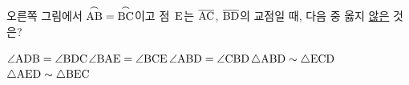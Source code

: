\noindent\begin{minipage}[t]{0.58\linewidth}\vspace{0pt}\raggedright 오른쪽 그림에서 $\overset{\frown}{\mathrm{AB}}=\overset{\frown}{\mathrm{BC}}$이고 점~$\mathrm{E}$는 $\overline{\mathrm{AC}}$, $\overline{\mathrm{BD}}$의 교점일 때, 다음 중 옳지 \underline{않은} 것은?\end{minipage}\hfill\begin{minipage}[t]{0.4\linewidth}\vspace{0pt}\centering \resizebox{\ifdim\width>\linewidth\linewidth\else\width\fi}{!}{}\end{minipage}\par
\begin{choicesv}{$\angle\mathrm{ADB}=\angle\mathrm{BDC}$}{$\angle\mathrm{BAE}=\angle\mathrm{BCE}$}{$\angle\mathrm{ABD}=\angle\mathrm{CBD}$}{$\triangle\mathrm{ABD}\sim\triangle\mathrm{ECD}$}{$\triangle\mathrm{AED}\sim\triangle\mathrm{BEC}$}\end{choicesv}
